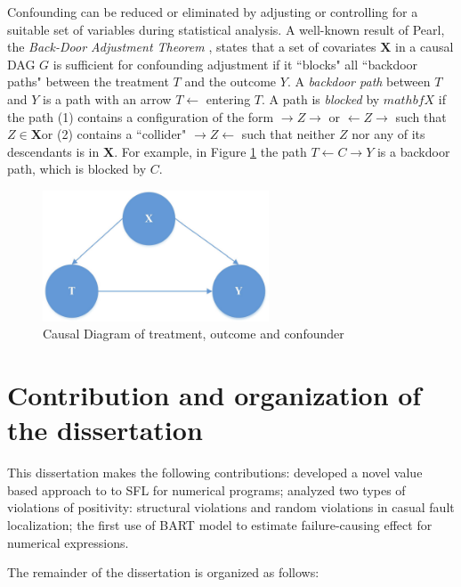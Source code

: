 Confounding can be reduced or eliminated by adjusting or controlling for a suitable set of variables during statistical analysis.  A well-known result of Pearl, the {\it Back-Door Adjustment Theorem} \cite{pearl2000models}, states that a set of covariates $\mathbf{X}$ in a causal DAG $G$ is sufficient for confounding adjustment if it ``blocks" all ``backdoor paths" between the treatment $T$ and the outcome $Y$.  A {\it backdoor path} between $T$ and $Y$ is a path with an arrow $T \leftarrow$ entering $T$.  A path is {\it blocked} by $mathbf{X}$ if the path (1) contains a configuration of the form $\rightarrow Z \rightarrow$ or $\leftarrow Z \rightarrow$ such that  $Z \in \mathbf{X}$or (2) contains a ``collider" $\rightarrow Z \leftarrow$  such that neither $Z$ nor any of its descendants is in $\mathbf{X}$.  For example, in Figure \ref{fig2.2} the path $T \leftarrow C \rightarrow Y$ is a backdoor path, which is blocked by $C$.

\begin{figure}[htb!]
\vspace{0em}
\begin{center}
\includegraphics[width=0.6\textwidth]{chapter2_CausalDAG1.pdf}
\vspace {0em}\caption{Causal Diagram of treatment, outcome and confounder} \label{fig2.2}
\end{center}
\vspace {0em}
\end{figure}

\section{Contribution and organization of the dissertation}

This dissertation makes the following contributions: developed a novel value based approach to to SFL for numerical programs; analyzed two types of violations of positivity: structural violations and random violations in casual fault localization; the first use of BART model to estimate failure-causing effect for numerical expressions.

The remainder of the dissertation is organized as follows:

